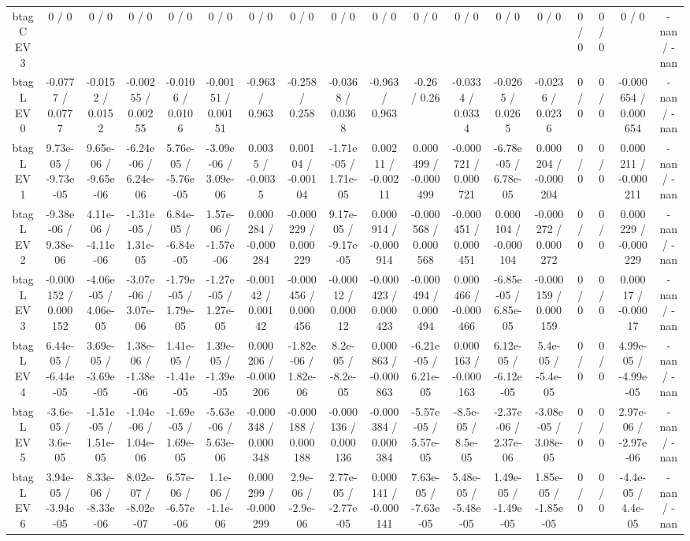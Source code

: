\documentclass[10pt]{article}
\begin{document}
\begin{table}[htbp]
\begin{center}
\begin{tabular}{|c|c|c|c|c|c|c|c|c|c|c|c|c|c|c|c|c|c|}
  btag C EV 3 & 0 / 0 & 0 / 0 & 0 / 0 & 0 / 0 & 0 / 0 & 0 / 0 & 0 / 0 & 0 / 0 & 0 / 0 & 0 / 0 & 0 / 0 & 0 / 0 & 0 / 0 & 0 / 0 & 0 / 0 & 0 / 0 & -nan / -nan \\ 
  btag L EV 0 & -0.0777 / 0.0777 & -0.0152 / 0.0152 & -0.00255 / 0.00255 & -0.0106 / 0.0106 & -0.00151 / 0.00151 & -0.963 / 0.963 & -0.258 / 0.258 & -0.0368 / 0.0368 & -0.963 / 0.963 & -0.26 / 0.26 & -0.0334 / 0.0334 & -0.0265 / 0.0265 & -0.0236 / 0.0236 & 0 / 0 & 0 / 0 & -0.000654 / 0.000654 & -nan / -nan \\ 
  btag L EV 1 & 9.73e-05 / -9.73e-05 & 9.65e-06 / -9.65e-06 & -6.24e-06 / 6.24e-06 & 5.76e-05 / -5.76e-05 & -3.09e-06 / 3.09e-06 & 0.0035 / -0.0035 & 0.00104 / -0.00104 & -1.71e-05 / 1.71e-05 & 0.00211 / -0.00211 & 0.000499 / -0.000499 & -0.000721 / 0.000721 & -6.78e-05 / 6.78e-05 & 0.000204 / -0.000204 & 0 / 0 & 0 / 0 & 0.000211 / -0.000211 & -nan / -nan \\ 
  btag L EV 2 & -9.38e-06 / 9.38e-06 & 4.11e-06 / -4.11e-06 & -1.31e-05 / 1.31e-05 & 6.84e-05 / -6.84e-05 & 1.57e-06 / -1.57e-06 & 0.000284 / -0.000284 & -0.000229 / 0.000229 & 9.17e-05 / -9.17e-05 & 0.000914 / -0.000914 & -0.000568 / 0.000568 & -0.000451 / 0.000451 & 0.000104 / -0.000104 & -0.000272 / 0.000272 & 0 / 0 & 0 / 0 & 0.000229 / -0.000229 & -nan / -nan \\ 
  btag L EV 3 & -0.000152 / 0.000152 & -4.06e-05 / 4.06e-05 & -3.07e-06 / 3.07e-06 & -1.79e-05 / 1.79e-05 & -1.27e-05 / 1.27e-05 & -0.00142 / 0.00142 & -0.000456 / 0.000456 & -0.00012 / 0.00012 & -0.000423 / 0.000423 & -0.000494 / 0.000494 & 0.000466 / -0.000466 & -6.85e-05 / 6.85e-05 & -0.000159 / 0.000159 & 0 / 0 & 0 / 0 & 0.00017 / -0.00017 & -nan / -nan \\ 
  btag L EV 4 & 6.44e-05 / -6.44e-05 & 3.69e-05 / -3.69e-05 & 1.38e-06 / -1.38e-06 & 1.41e-05 / -1.41e-05 & 1.39e-05 / -1.39e-05 & 0.000206 / -0.000206 & -1.82e-06 / 1.82e-06 & 8.2e-05 / -8.2e-05 & 0.000863 / -0.000863 & -6.21e-05 / 6.21e-05 & 0.000163 / -0.000163 & 6.12e-05 / -6.12e-05 & 5.4e-05 / -5.4e-05 & 0 / 0 & 0 / 0 & 4.99e-05 / -4.99e-05 & -nan / -nan \\ 
  btag L EV 5 & -3.6e-05 / 3.6e-05 & -1.51e-05 / 1.51e-05 & -1.04e-06 / 1.04e-06 & -1.69e-05 / 1.69e-05 & -5.63e-06 / 5.63e-06 & -0.000348 / 0.000348 & -0.000188 / 0.000188 & -0.000136 / 0.000136 & -0.000384 / 0.000384 & -5.57e-05 / 5.57e-05 & -8.5e-05 / 8.5e-05 & -2.37e-06 / 2.37e-06 & -3.08e-05 / 3.08e-05 & 0 / 0 & 0 / 0 & 2.97e-06 / -2.97e-06 & -nan / -nan \\ 
  btag L EV 6 & 3.94e-05 / -3.94e-05 & 8.33e-06 / -8.33e-06 & 8.02e-07 / -8.02e-07 & 6.57e-06 / -6.57e-06 & 1.1e-06 / -1.1e-06 & 0.000299 / -0.000299 & 2.9e-06 / -2.9e-06 & 2.77e-05 / -2.77e-05 & 0.000141 / -0.000141 & 7.63e-05 / -7.63e-05 & 5.48e-05 / -5.48e-05 & 1.49e-05 / -1.49e-05 & 1.85e-05 / -1.85e-05 & 0 / 0 & 0 / 0 & -4.4e-05 / 4.4e-05 & -nan / -nan \\ 

\end{tabular}
\end{center}
\end{table}
\end{document}
